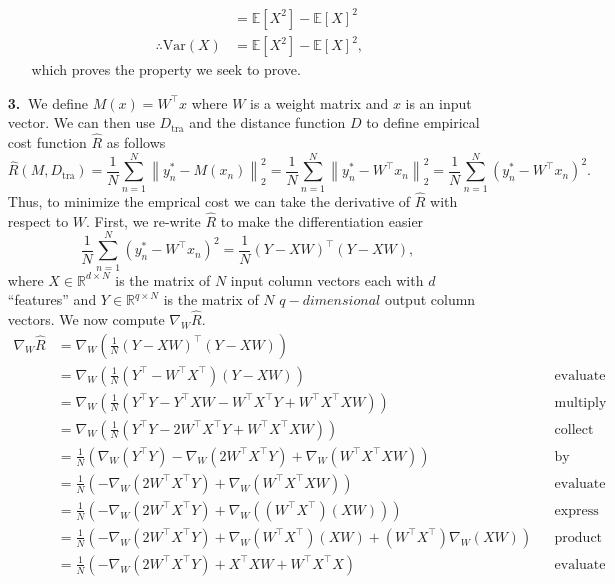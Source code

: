 \documentclass [10pt]{article}
\newcommand{\norm}[1]{\left\lVert#1\right\rVert}
\begin{document}
\begin{enumerate}
\begin{enumerate}
\begin{align}
			&=\mathbb{E}[X^{2}]-\mathbb{E}[X]^{2}\nonumber\\
			\therefore\text{Var}(X)&=\mathbb{E}[X^{2}]-\mathbb{E}[X]^{2},\nonumber
		\end{align}
		which proves the property we seek to prove.
	\end{enumerate}
	\newpage
	\item[\textbf{3.$\>$}]
	We define $M(x) = W^{\top}x$ where $W$ is a weight matrix and $x$ is an input vector. We can then use $D_{\text{tra}}$ and the distance function $D$ to define empirical cost function $\hat{R}$ as follows$$\hat{R}(M,D_{\text{tra}})=\frac{1}{N}\sum_{n=1}^{N}\norm{y_{n}^{*}-M(x_{n})}^{2}_{2}=\frac{1}{N}\sum_{n=1}^{N}\norm{y_{n}^{*}-W^{\top}x_{n}}^{2}_{2}=\frac{1}{N}\sum_{n=1}^{N}(y_{n}^{*}-W^{\top}x_{n})^{2}.$$Thus, to minimize the emprical cost we can take the derivative of $\hat{R}$ with respect to $W$. First, we re-write $\hat{R}$ to make the differentiation easier $$\frac{1}{N}\sum_{n=1}^{N}(y_{n}^{*}-W^{\top}x_{n})^{2}=\frac{1}{N}(Y-XW)^{\top}(Y-XW),$$where $X\in\mathbb{R}^{d\times N}$ is the matrix of $N$ input column vectors each with $d$ ``features'' and $Y\in\mathbb{R}^{q\times N}$ is the matrix of $N$ $q-dimensional$ output column vectors. We now compute $\nabla_{W}\hat{R}$.
	\begin{align}
		\nabla_{W}\hat{R}&=\nabla_{W}(\frac{1}{N}(Y-XW)^{\top}(Y-XW))\nonumber\\
		&=\nabla_{W}(\frac{1}{N}(Y^{\top}-W^{\top}X^{\top})(Y-XW))&&\text{evaluate transpose}\nonumber\\
		&=\nabla_{W}(\frac{1}{N}(Y^{\top}Y-Y^{\top}XW-W^{\top}X^{\top}Y+W^{\top}X^{\top}XW))&&\text{multiply terms}\nonumber\\
		&=\nabla_{W}(\frac{1}{N}(Y^{\top}Y-2W^{\top}X^{\top}Y+W^{\top}X^{\top}XW))&&\text{collect like terms}\nonumber\\
		&=\frac{1}{N}(\nabla_{W}(Y^{\top}Y)-\nabla_{W}(2W^{\top}X^{\top}Y)+\nabla_{W}(W^{\top}X^{\top}XW))&&\text{by linearity}\nonumber\\
		&=\frac{1}{N}(-\nabla_{W}(2W^{\top}X^{\top}Y)+\nabla_{W}(W^{\top}X^{\top}XW))&&\text{evaluate gradient}\nonumber\\
		&=\frac{1}{N}(-\nabla_{W}(2W^{\top}X^{\top}Y)+\nabla_{W}((W^{\top}X^{\top})(XW)))&&\text{express as product}\nonumber\\
		&=\frac{1}{N}(-\nabla_{W}(2W^{\top}X^{\top}Y)+\nabla_{W}(W^{\top}X^{\top})(XW)+(W^{\top}X^{\top})\nabla_{W}(XW))&&\text{product rule}\nonumber\\
		&=\frac{1}{N}(-\nabla_{W}(2W^{\top}X^{\top}Y)+X^{\top}XW+W^{\top}X^{\top}X)&&\text{evaluate gradient}\nonumber\\

\end{align}
\end{enumerate}
\end{document}
